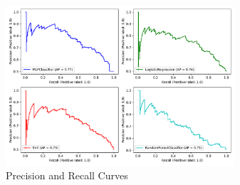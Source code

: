 \begin{figure}[ht]
\includegraphics[width=8.5cm]{plots/precisionrecall.pdf}
\caption{Precision and Recall Curves}

\label{par}
\centering
\end{figure}

